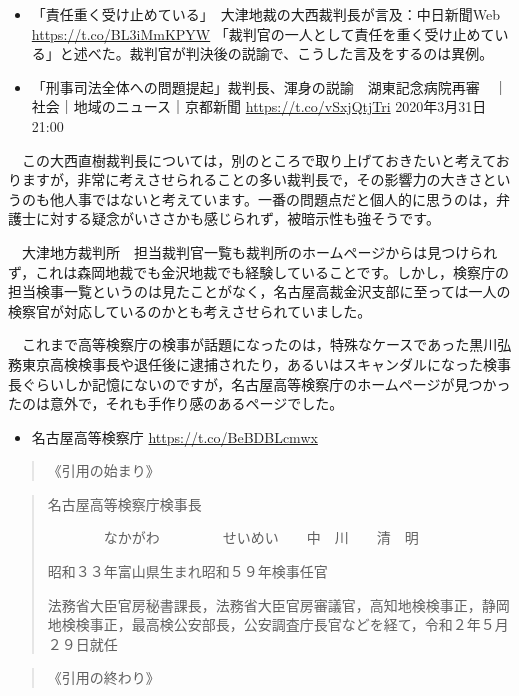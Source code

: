 \documentclass[
]{ltjarticle}
\providecommand{\tightlist}{%
  \setlength{\itemsep}{0pt}\setlength{\parskip}{0pt}}
\begin{document}
\begin{itemize}
\item
  「責任重く受け止めている」　大津地裁の大西裁判長が言及：中日新聞Web
  \url{https://t.co/BL3iMmKPYW} 
  「裁判官の一人として責任を重く受け止めている」と述べた。裁判官が判決後の説諭で、こうした言及をするのは異例。
\item
  「刑事司法全体への問題提起」裁判長、渾身の説諭　湖東記念病院再審　｜社会｜地域のニュース｜京都新聞
  \url{https://t.co/vSxjQtjTri}  2020年3月31日 21:00
\end{itemize}

　この大西直樹裁判長については，別のところで取り上げておきたいと考えておりますが，非常に考えさせられることの多い裁判長で，その影響力の大きさというのも他人事ではないと考えています。一番の問題点だと個人的に思うのは，弁護士に対する疑念がいささかも感じられず，被暗示性も強そうです。

　大津地方裁判所　担当裁判官一覧も裁判所のホームページからは見つけられず，これは森岡地裁でも金沢地裁でも経験していることです。しかし，検察庁の担当検事一覧というのは見たことがなく，名古屋高裁金沢支部に至っては一人の検察官が対応しているのかとも考えさせられていました。

　これまで高等検察庁の検事が話題になったのは，特殊なケースであった黒川弘務東京高検検事長や退任後に逮捕されたり，あるいはスキャンダルになった検事長ぐらいしか記憶にないのですが，名古屋高等検察庁のホームページが見つかったのは意外で，それも手作り感のあるページでした。

\begin{itemize}
\tightlist
\item
  名古屋高等検察庁 \url{https://t.co/BeBDBLcmwx} 
\end{itemize}

\begin{quote}
《引用の始まり》
\end{quote}

\begin{quote}
名古屋高等検察庁検事長

　　　　なかがわ　　　　~せいめい　　中　川　　清　明

昭和３３年富山県生まれ昭和５９年検事任官

法務省大臣官房秘書課長，法務省大臣官房審議官，高知地検検事正，静岡地検検事正，最高検公安部長，公安調査庁長官などを経て，令和２年５月２９日就任
\end{quote}

\begin{quote}
《引用の終わり》
\end{quote}
\end{document}
